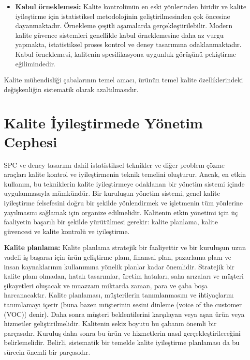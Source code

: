 \documentclass[
]{book}
\providecommand{\tightlist}{%
  \setlength{\itemsep}{0pt}\setlength{\parskip}{0pt}}
\begin{document}
\begin{itemize}
\tightlist
\item
  \textbf{Kabul örneklemesi:} Kalite kontrolünün en eski yönlerinden biridir ve kalite iyileştirme için istatistiksel metodolojinin geliştirilmesinden çok öncesine dayanmaktadır. Örnekleme çeşitli aşamalarda gerçekleştirilebilir. Modern kalite güvence sistemleri genellikle kabul örneklemesine daha az vurgu yapmakta, istatistiksel proses kontrol ve deney tasarımına odaklanmaktadır. Kabul örneklemesi, kalitenin spesifikasyona uygunluk görüşünü pekiştirme eğilimindedir.
\end{itemize}

Kalite mühendisliği çabalarının temel amacı, ürünün temel kalite özelliklerindeki değişkenliğin sistematik olarak azaltılmasıdır.

\hypertarget{kalite-iyileux15ftirmede-yuxf6netim-cephesi}{%
\section{Kalite İyileştirmede Yönetim Cephesi}\label{kalite-iyileux15ftirmede-yuxf6netim-cephesi}}

SPC ve deney tasarımı dahil istatistiksel teknikler ve diğer problem çözme araçları kalite kontrol ve iyileştirmenin teknik temelini oluşturur. Ancak, en etkin kullanım, bu tekniklerin kalite iyileştirmeye odaklanan bir yönetim sistemi içinde uygulanmasıyla mümkündür. Bir kuruluşun yönetim sistemi, genel kalite iyileştirme felsefesini doğru bir şekilde yönlendirmek ve işletmenin tüm yönlerine yayılmasını sağlamak için organize edilmelidir. Kalitenin etkin yönetimi için üç faaliyetin başarılı bir şekilde yürütülmesi gerekir: kalite planlama, kalite güvencesi ve kalite kontrolü ve iyileştirme.

\textbf{Kalite planlama:} Kalite planlama stratejik bir faaliyettir ve bir kuruluşun uzun vadeli iş başarısı için ürün geliştirme planı, finansal plan, pazarlama planı ve insan kaynaklarının kullanımına yönelik planlar kadar önemlidir. Stratejik bir kalite planı olmadan, hatalı tasarımlar, üretim hataları, saha arızaları ve müşteri şikayetleri oluşacak ve muazzam miktarda zaman, para ve çaba boşa harcanacaktır. Kalite planlaması, müşterilerin tanımlanmasını ve ihtiyaçlarını tanımlamayı içerir (buna bazen müşterinin sesini dinleme (voice of the customer (VOC)) denir). Daha sonra müşteri beklentilerini karşılayan veya aşan ürün veya hizmetler geliştirilmelidir. Kalitenin sekiz boyutu bu çabanın önemli bir parçasıdır. Kuruluş daha sonra bu ürün ve hizmetlerin nasıl gerçekleştirileceğini belirlemelidir. Belirli, sistematik bir temelde kalite iyileştirme planlaması da bu sürecin önemli bir parçasıdır.
\end{document}
